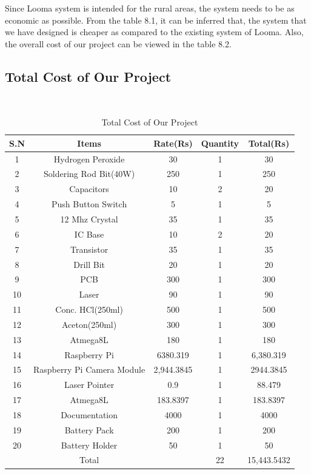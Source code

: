 \documentclass[12pt, a4paper]{article}
\begin{document}
{Since Looma system is intended for the rural areas, the system needs to be as economic as possible. From the table 8.1, it can be inferred that, the system that we have designed is cheaper as compared to the existing system of Looma. Also, the overall cost of our project can be viewed in the table 8.2.
\clearpage
\subsection{Total Cost of Our Project}
~\\
\begin{table}[ht]
\begin{tabular}{|c|c|c|c|c|}
\hline
	S.N & Items & Rate(Rs) & Quantity & Total(Rs) \\
\hline
	1 & Hydrogen Peroxide & 30 & 1 & 30 \\
\hline
	2 & Soldering Rod Bit(40W) & 250 & 1 & 250 \\
\hline
	3 & Capacitors & 10 & 2 & 20 \\
\hline
	4 & Push Button Switch & 5 & 1 & 5 \\
\hline
	5 & 12 Mhz Crystal & 35 & 1 & 35 \\
\hline
	6 & IC Base & 10 & 2 & 20 \\
\hline
	7 & Transistor & 35 & 1 & 35 \\
\hline
	8 & Drill Bit & 20 & 1 & 20 \\
\hline
	9 & PCB & 300 & 1 & 300 \\
\hline
	10 & Laser & 90 & 1 & 90 \\
\hline
	11 & Conc. HCl(250ml) & 500 & 1 & 500 \\
\hline
	12 & Aceton(250ml) & 300 & 1 & 300 \\
\hline
	13 & Atmega8L & 180 & 1 & 180 \\
\hline
	14 & Raspberry Pi & 6380.319 & 1 & 6,380.319 \\
\hline
	15 & Raspberry Pi Camera Module & 2,944.3845 & 1 & 2944.3845 \\
\hline
	16 & Laser Pointer &  0.9 & 1 & 88.479 \\
\hline 
    17 & Atmega8L & 183.8397 & 1 & 183.8397 \\
\hline
	18 & Documentation &  4000 & 1 & 4000 \\
\hline
	19 & Battery Pack & 200 & 1 & 200 \\
\hline 
    20 & Battery Holder & 50 & 1 & 50 \\
\hline 
	   & Total & & 22 & 15,443.5432\\
\hline	   
\end{tabular}
\caption{Total Cost of Our Project}
\label{tb:sw}
\end{table}
\newpage
}
\end{document}
